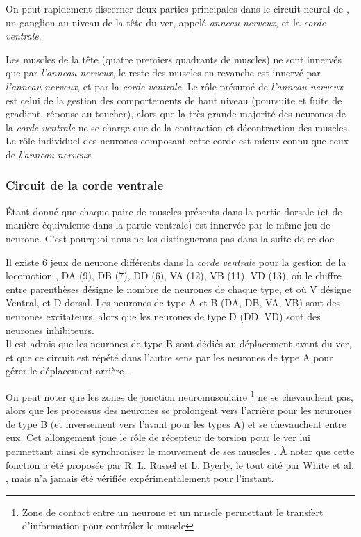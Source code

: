 On peut rapidement discerner deux parties principales dans le circuit neural de
\celeg{}, un ganglion au niveau de la tête du ver, appelé \textit{anneau
nerveux}, et la \textit{corde ventrale}.

Les muscles de la tête (quatre premiers quadrants de muscles) ne sont innervés que
par \textit{l'anneau nerveux}, le reste des muscles en revanche est innervé
par \textit{l'anneau nerveux}, et par la \textit{corde ventrale}.  Le rôle
présumé de \textit{l'anneau nerveux} est celui de la gestion des comportements
de haut niveau (poursuite et fuite de gradient, réponse au toucher), alors que la
très grande majorité des neurones de la \textit{corde ventrale} ne se charge que
de la contraction et décontraction des muscles. Le rôle individuel des neurones
composant cette corde est mieux connu que ceux de \textit{l'anneau nerveux}.


\subsubsection{Circuit de la corde ventrale} %
\label{ssub:Circuit de la corde ventrale}

Étant donné que chaque paire de muscles présents dans la partie dorsale (et de
manière équivalente dans la partie ventrale) est innervée par le même jeu de
neurone. C'est pourquoi nous ne les distinguerons pas dans la suite de ce doc

Il existe 6 jeux de neurone différents dans la \textit{corde ventrale} pour la
gestion de la locomotion \cite{Boyle2009}, DA (9), DB (7), DD (6), VA (12), VB
(11), VD (13), où le chiffre entre parenthèses désigne le nombre de neurones de
chaque type, et où V désigne Ventral, et D dorsal.  Les neurones de type A et B
(DA, DB, VA, VB) sont des neurones excitateurs, alors que les neurones de type D
(DD, VD) sont des neurones inhibiteurs.\\


Il est admis que les neurones de type B sont dédiés au déplacement avant du ver,
et que ce circuit est répété dans l'autre sens par les neurones de type A
pour gérer le déplacement arrière \cite{AltunZ.F.andHall2011,Boyle2009,White1986}.

On peut noter que les zones de jonction neuromusculaire \footnote{Zone de
contact entre un neurone et un muscle permettant le transfert d'information 
pour contrôler le muscle} ne se chevauchent pas, alors que les processus
des neurones se prolongent vers l'arrière pour les neurones de type B (et
inversement vers l'avant pour les types A) et se chevauchent entre eux. Cet
allongement joue le rôle de récepteur de torsion pour le ver lui permettant
ainsi de synchroniser le mouvement de ses muscles \cite{Boyle2009}. À noter que
cette fonction a été proposée par R. L. Russel et L. Byerly, le tout cité par
White et al. \cite{White1986}, mais n'a jamais été vérifiée expérimentalement
pour l'instant.


